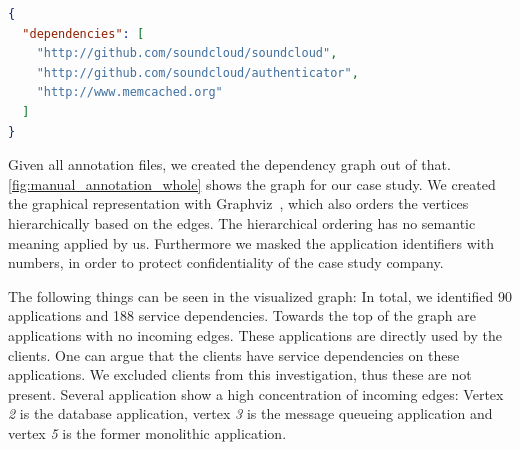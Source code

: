 \pagebreak

\begin{lstlisting}[language=json,firstnumber=1,caption=Dependency graph: the manual annotation file in JSON format for the threaded-comments application ,label=list:manual_annotation]
{
  "dependencies": [
    "http://github.com/soundcloud/soundcloud",
    "http://github.com/soundcloud/authenticator",
    "http://www.memcached.org"
  ]
}
\end{lstlisting}

Given all annotation files, we created the dependency graph out of that. \autoref{fig:manual_annotation_whole} shows the graph for our case study. We created the graphical representation with Graphviz~\cite{graphviz}, which also orders the vertices hierarchically based on the edges. The hierarchical ordering has no semantic meaning applied by us. Furthermore we masked the application identifiers with numbers, in order to protect confidentiality of the case study company.

The following things can be seen in the visualized graph: In total, we identified 90 applications and 188 service dependencies. Towards the top of the graph are applications with no incoming edges. These applications are directly used by the clients. One can argue that the clients have service dependencies on these applications. We excluded clients from this investigation, thus these are not present. Several application show a high concentration of incoming edges: Vertex \emph{2} is the database application, vertex \emph{3} is the message queueing application and vertex \emph{5} is the former monolithic application.



